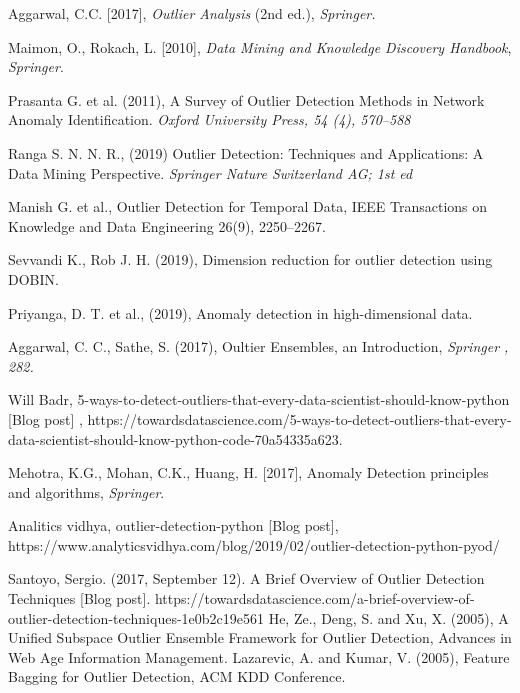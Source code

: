 \begin{thebibliography}{99}

 Aggarwal, C.C. [2017],  \textit{Outlier Analysis} (2nd ed.), {\it Springer.} 

 Maimon, O.,  Rokach, L. [2010], \textit{Data Mining and Knowledge Discovery Handbook}, {\it Springer}. 

 Prasanta G. et al. (2011), A Survey of Outlier Detection Methods in Network Anomaly Identification. {\it Oxford University Press, 54 (4), 570--588 }

 Ranga S. N. N. R., (2019) Outlier Detection: Techniques and Applications: A Data Mining Perspective. {\it Springer Nature Switzerland AG; 1st ed}

 Manish G. et al., Outlier Detection for Temporal Data, IEEE Transactions on Knowledge and Data Engineering 26(9), 2250–2267.

 Sevvandi K., Rob J. H. (2019), Dimension reduction for outlier detection using DOBIN.

 Priyanga, D. T. et al., (2019),  Anomaly detection in high-dimensional data.

 Aggarwal, C. C., Sathe, S. (2017), Oultier Ensembles, an Introduction, {\it Springer , 282.}

 Will Badr,  5-ways-to-detect-outliers-that-every-data-scientist-should-know-python [Blog post] , https://towardsdatascience.com/5-ways-to-detect-outliers-that-every-data-scientist-should-know-python-code-70a54335a623. 

 Mehotra, K.G., Mohan, C.K., Huang, H. [2017],  Anomaly Detection principles and algorithms, {\it Springer}. 

  Analitics vidhya, outlier-detection-python [Blog post], https://www.analyticsvidhya.com/blog/2019/02/outlier-detection-python-pyod/

 Santoyo, Sergio. (2017, September 12). A Brief Overview of Outlier Detection Techniques [Blog post]. https://towardsdatascience.com/a-brief-overview-of-outlier-detection-techniques-1e0b2c19e561
 He, Ze., Deng, S. and Xu, X. (2005), A Unified Subspace Outlier Ensemble Framework for Outlier Detection, Advances in Web Age Information Management.
 Lazarevic, A.  and Kumar, V. (2005), Feature Bagging for Outlier Detection, ACM KDD Conference.


\end{thebibliography}

